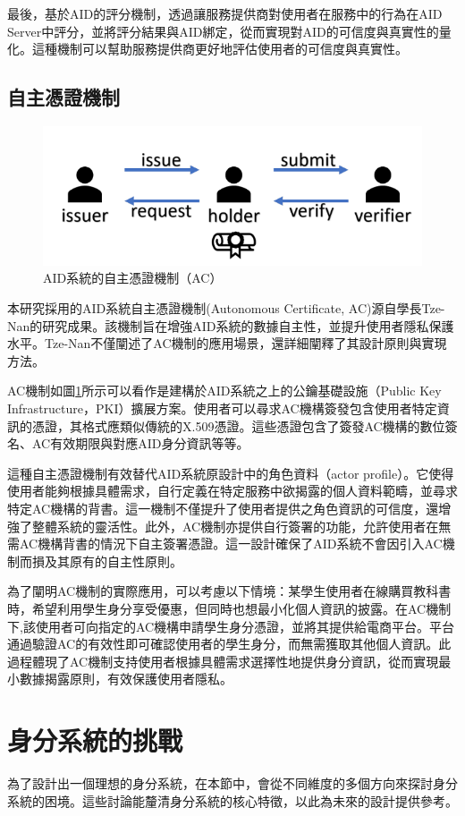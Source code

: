 最後，基於AID的評分機制，透過讓服務提供商對使用者在服務中的行為在AID Server中評分，並將評分結果與AID綁定，從而實現對AID的可信度與真實性的量化。這種機制可以幫助服務提供商更好地評估使用者的可信度與真實性。
\subsection{自主憑證機制}
\begin{figure}
  \centering
  \includegraphics[width=\linewidth,keepaspectratio]{figures/old-AC.png}
  \caption{AID系統的自主憑證機制（AC）}
  \label{fig:old-ac}
\end{figure}
本研究採用的AID系統自主憑證機制(Autonomous Certificate, AC)源自學長Tze-Nan\cite{NTU202102846}的研究成果。該機制旨在增強AID系統的數據自主性，並提升使用者隱私保護水平。Tze-Nan不僅闡述了AC機制的應用場景，還詳細闡釋了其設計原則與實現方法。

AC機制如圖\ref{fig:old-ac}所示可以看作是建構於AID系統之上的公鑰基礎設施（Public Key Infrastructure，PKI）擴展方案。使用者可以尋求AC機構簽發包含使用者特定資訊的憑證，其格式應類似傳統的X.509憑證\cite{itu-t-rec-x509}。這些憑證包含了簽發AC機構的數位簽名、AC有效期限與對應AID身分資訊等等。

這種自主憑證機制有效替代AID系統原設計中的角色資料（actor profile）。它使得使用者能夠根據具體需求，自行定義在特定服務中欲揭露的個人資料範疇，並尋求特定AC機構的背書。這一機制不僅提升了使用者提供之角色資訊的可信度，還增強了整體系統的靈活性。此外，AC機制亦提供自行簽署的功能，允許使用者在無需AC機構背書的情況下自主簽署憑證。這一設計確保了AID系統不會因引入AC機制而損及其原有的自主性原則。

為了闡明AC機制的實際應用，可以考慮以下情境：某學生使用者在線購買教科書時，希望利用學生身分享受優惠，但同時也想最小化個人資訊的披露。在AC機制下,該使用者可向指定的AC機構申請學生身分憑證，並將其提供給電商平台。平台通過驗證AC的有效性即可確認使用者的學生身分，而無需獲取其他個人資訊。此過程體現了AC機制支持使用者根據具體需求選擇性地提供身分資訊，從而實現最小數據揭露原則，有效保護使用者隱私。
\section{身分系統的挑戰}
為了設計出一個理想的身分系統，在本節中，會從不同維度的多個方向來探討身分系統的困境。這些討論能釐清身分系統的核心特徵，以此為未來的設計提供參考。
